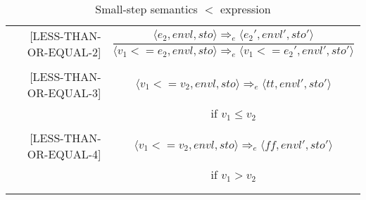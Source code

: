 \begin{longtable}[c] { r c }
  [LESS-THAN-OR-EQUAL-2] & \( 
    \dfrac { \langle e_2, envl, sto \rangle \Rightarrow_e \langle e_2', envl', sto' \rangle }
      { \langle v_1 < = e_2, envl, sto \rangle \Rightarrow_e \langle v_1 < = e_2', envl', sto' \rangle } \)
  \\
  & \\

  [LESS-THAN-OR-EQUAL-3] & \( 
    \langle v_1 < = v_2, envl, sto \rangle \Rightarrow_e \langle tt, envl', sto' \rangle \)
  \\
  & if \( v_1 \leq v_2 \) \\
  & \\

  [LESS-THAN-OR-EQUAL-4] & \( 
    \langle v_1 < = v_2, envl, sto \rangle \Rightarrow_e \langle ff, envl', sto' \rangle \)
  \\
  & if \( v_1 > v_2 \) \\
  & \\
  \caption{Small-step semantics $<$ expression}
\end{longtable}